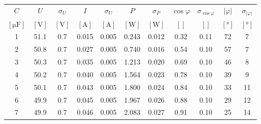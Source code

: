\begin{tabular}{
    S[table-format=1.0]
    S[table-format=2.1]
    S[table-format=1.1]
    S[table-format=1.3]
    S[table-format=1.3]
    S[table-format=1.3]
    S[table-format=1.3]
    S[table-format=1.2]
    S[table-format=1.2]
    S[table-format=2.0]
    S[table-format=2.0]
} \toprule
{$C$}                   & {$U$}            & {$\sigma_U$}     & {$I$}              & {$\sigma_U$}       & {$P$}            & {$\sigma_P$}     & {$\cos \varphi$} & {$\sigma_{\cos \varphi}$} & {$|\varphi|$}      & {$\sigma_{|\varphi|}$} \\
{$[\si{\micro\farad}]$} & {$[\si{\volt}]$} & {$[\si{\volt}]$} & {$[\si{\ampere}]$} & {$[\si{\ampere}]$} & {$[\si{\watt}]$} & {$[\si{\watt}]$} & {$[]$}           & {$[]$}                    & {$[\si{\degree}]$} & {$[\si{\degree}]$}     \\                        & 51.1             & 0.7              & 0.015              & 0.005              & 0.243            & 0.012            & 0.32             & 0.11                      & 72                 & 7                      \\
2                       & 50.8             & 0.7              & 0.027              & 0.005              & 0.740            & 0.016            & 0.54             & 0.10                      & 57                 & 7                      \\
3                       & 50.3             & 0.7              & 0.035              & 0.005              & 1.213            & 0.020            & 0.69             & 0.10                      & 46                 & 8                      \\
4                       & 50.2             & 0.7              & 0.040              & 0.005              & 1.564            & 0.023            & 0.78             & 0.10                      & 39                 & 9                      \\
5                       & 50.1             & 0.7              & 0.043              & 0.005              & 1.800            & 0.024            & 0.84             & 0.10                      & 33                 & 11                     \\
6                       & 49.9             & 0.7              & 0.045              & 0.005              & 1.967            & 0.026            & 0.88             & 0.10                      & 29                 & 12                     \\
7                       & 49.9             & 0.7              & 0.046              & 0.005              & 2.083            & 0.027            & 0.91             & 0.10                      & 25                 & 14                     \\

\end{tabular}
